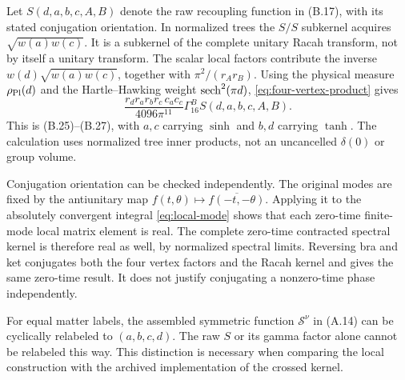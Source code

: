 Let $S(d,a,b,c,A,B)$ denote the raw recoupling function in (B.17),
with its stated conjugation orientation. In normalized trees the $S/S$
subkernel acquires $\sqrt{w(a)w(c)}$. It is a subkernel of the complete
unitary Racah transform, not by itself a unitary transform.
The scalar local factors contribute the inverse
$w(d)\sqrt{w(a)w(c)}$, together with $\pi^2/(r_Ar_B)$.
Using the physical measure $\rho_{\mathrm{Pl}}(d)$ and the Hartle--Hawking weight
$\operatorname{sech}^2(\pi d)$, \eqref{eq:four-vertex-product} gives
\begin{equation}
 \frac{r_dr_ar_br_c\,c_ac_c}{4096\pi^{11}}
              \Gamma_{16}^{B}S(d,a,b,c,A,B).
 \label{eq:HH-prefactor}
\end{equation}
This is (B.25)--(B.27), with $a,c$ carrying $\sinh$ and $b,d$
carrying $\tanh$. The calculation uses normalized tree inner products,
not an uncancelled $\delta(0)$ or group volume.

Conjugation orientation can be checked independently. The original modes
are fixed by the antiunitary map
$f(t,\theta)\mapsto\overline{f(-t,-\theta)}$. Applying it to the
absolutely convergent integral \eqref{eq:local-mode} shows that each
zero-time finite-mode local matrix element is real. The complete
zero-time contracted spectral kernel is therefore real as well, by
normalized spectral limits. Reversing bra and ket conjugates both the four
vertex factors and the Racah kernel and gives the same zero-time result.
It does not justify conjugating a nonzero-time phase independently.

For equal matter labels, the assembled symmetric function
$\mathcal S^\nu$ in (A.14) can be cyclically relabeled to $(a,b,c,d)$.
The raw $S$ or its gamma factor alone cannot be relabeled this way.
This distinction is necessary when comparing the local construction with
the archived implementation of the crossed kernel.
